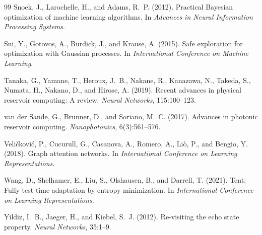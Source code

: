 \documentclass[11pt,a4paper]{article}
\begin{document}
\begin{thebibliography}{99}
Snoek, J., Larochelle, H., and Adams, R.~P. (2012).
Practical Bayesian optimization of machine learning algorithms.
In \emph{Advances in Neural Information Processing Systems}.

Sui, Y., Gotovos, A., Burdick, J., and Krause, A. (2015).
Safe exploration for optimization with Gaussian processes.
In \emph{International Conference on Machine Learning}.

Tanaka, G., Yamane, T., Heroux, J.~B., Nakane, R., Kanazawa, N., Takeda, S., Numata, H., Nakano, D., and Hirose, A. (2019).
Recent advances in physical reservoir computing: A review.
\emph{Neural Networks}, 115:100--123.

van der Sande, G., Brunner, D., and Soriano, M.~C. (2017).
Advances in photonic reservoir computing.
\emph{Nanophotonics}, 6(3):561--576.

Veli\v{c}kovi\'{c}, P., Cucurull, G., Casanova, A., Romero, A., Li\`o, P., and Bengio, Y. (2018).
Graph attention networks.
In \emph{International Conference on Learning Representations}.

Wang, D., Shelhamer, E., Liu, S., Olshausen, B., and Darrell, T. (2021).
Tent: Fully test-time adaptation by entropy minimization.
In \emph{International Conference on Learning Representations}.

Yildiz, I.~B., Jaeger, H., and Kiebel, S.~J. (2012).
Re-visiting the echo state property.
\emph{Neural Networks}, 35:1--9.

\end{thebibliography}
\end{document}

